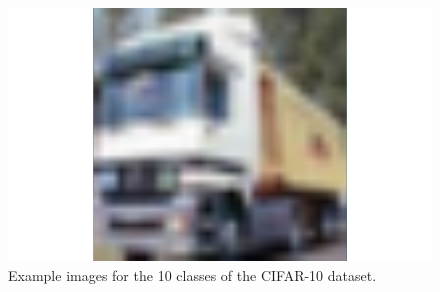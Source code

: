 \begin{figure}
\begin{minipage}{0.19\textwidth}
 \end{minipage}
 \begin{minipage}{0.19\textwidth}
  \includegraphics[width=1.5\textwidth]{../plots/cifar10-class9}
 \end{minipage}
 \caption{Example images for the 10 classes of the CIFAR-10 dataset.}
 \label{cifar10_dataset}
\end{figure}
